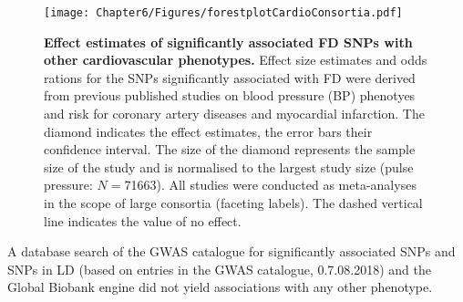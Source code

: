 \begin{figure}[hbtp]
	\centering
	\texttt{[image: Chapter6/Figures/forestplotCardioConsortia.pdf]}
	\caption[\textbf{Effect estimates of significantly associated FD SNPs with other cardiovascular phenotypes. }]{\textbf{Effect estimates of significantly associated FD SNPs with other cardiovascular phenotypes. }Effect size estimates and odds rations for the SNPs significantly associated with FD were derived from previous published studies on blood pressure (BP) phenotyes and risk for coronary artery diseases and myocardial infarction. The diamond indicates the effect estimates, the error bars their confidence interval. The size of the diamond represents the sample size of the study and is normalised to the largest study size (pulse pressure: \(N=\)\num{71663}). All studies were conducted as meta-analyses in the scope of large consortia (faceting labels). The dashed vertical line indicates the value of no effect. }
	 	\label{fig:consortia}
\end{figure}

A database search of the GWAS catalogue \citep{MacArthur2017} for significantly associated SNPs and SNPs in LD  (based on entries in the GWAS catalogue, 0.7.08.2018) and the Global Biobank engine \citep{BiobankEngine2017} did not yield associations with any other phenotype. 
